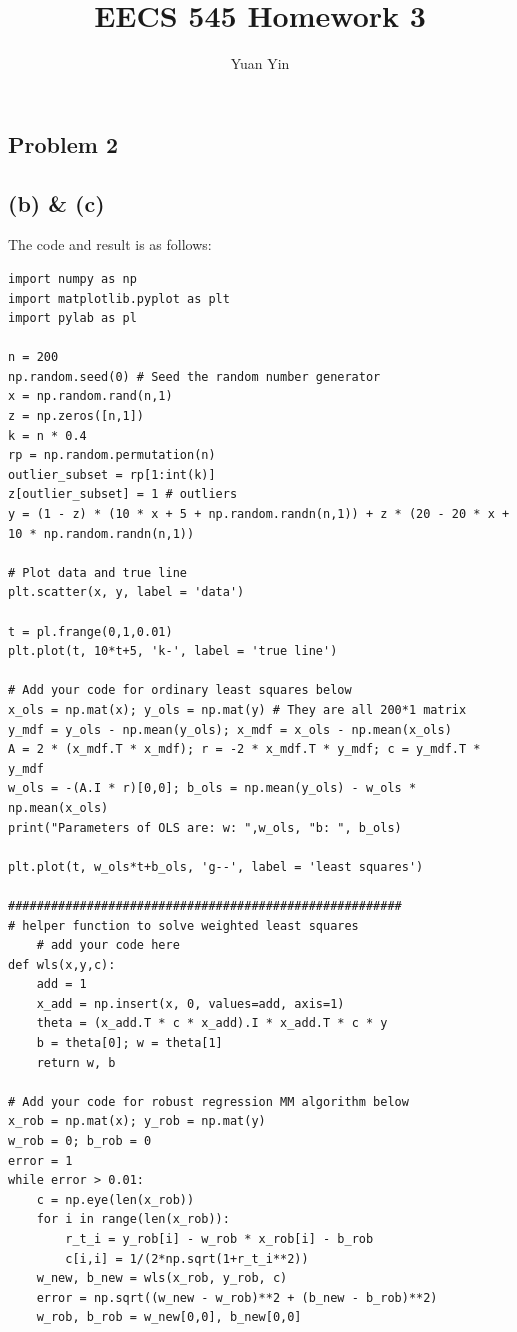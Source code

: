 \documentclass[letterpaper,11pt]{article}
\author{Yuan Yin}
\title{EECS 545 Homework 3}
\begin{document}
\large
\maketitle
\begin{spacing}{1.2}  %
\section*{Problem 2}
\subsection*{(b) \& (c)}
The code and result is as follows:
\begin{lstlisting}
import numpy as np
import matplotlib.pyplot as plt
import pylab as pl

n = 200
np.random.seed(0) # Seed the random number generator
x = np.random.rand(n,1)
z = np.zeros([n,1])
k = n * 0.4
rp = np.random.permutation(n)
outlier_subset = rp[1:int(k)]
z[outlier_subset] = 1 # outliers
y = (1 - z) * (10 * x + 5 + np.random.randn(n,1)) + z * (20 - 20 * x + 10 * np.random.randn(n,1))

# Plot data and true line
plt.scatter(x, y, label = 'data')

t = pl.frange(0,1,0.01)
plt.plot(t, 10*t+5, 'k-', label = 'true line')

# Add your code for ordinary least squares below
x_ols = np.mat(x); y_ols = np.mat(y) # They are all 200*1 matrix
y_mdf = y_ols - np.mean(y_ols); x_mdf = x_ols - np.mean(x_ols)
A = 2 * (x_mdf.T * x_mdf); r = -2 * x_mdf.T * y_mdf; c = y_mdf.T * y_mdf
w_ols = -(A.I * r)[0,0]; b_ols = np.mean(y_ols) - w_ols * np.mean(x_ols)
print("Parameters of OLS are: w: ",w_ols, "b: ", b_ols)

plt.plot(t, w_ols*t+b_ols, 'g--', label = 'least squares')

#######################################################
# helper function to solve weighted least squares
    # add your code here
def wls(x,y,c):
    add = 1
    x_add = np.insert(x, 0, values=add, axis=1)
    theta = (x_add.T * c * x_add).I * x_add.T * c * y
    b = theta[0]; w = theta[1]
    return w, b

# Add your code for robust regression MM algorithm below
x_rob = np.mat(x); y_rob = np.mat(y)
w_rob = 0; b_rob = 0
error = 1
while error > 0.01:
    c = np.eye(len(x_rob))
    for i in range(len(x_rob)):
        r_t_i = y_rob[i] - w_rob * x_rob[i] - b_rob
        c[i,i] = 1/(2*np.sqrt(1+r_t_i**2))
    w_new, b_new = wls(x_rob, y_rob, c)
    error = np.sqrt((w_new - w_rob)**2 + (b_new - b_rob)**2)
    w_rob, b_rob = w_new[0,0], b_new[0,0]


\end{lstlisting}
\end{spacing}
\end{document}
